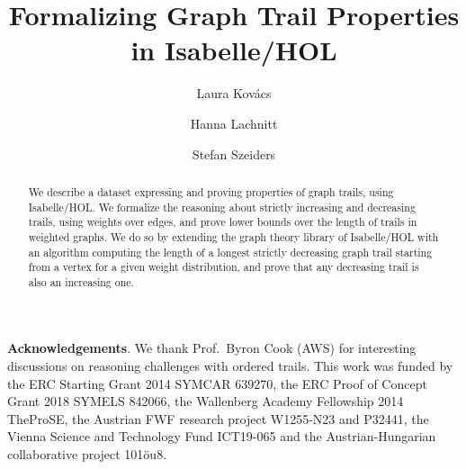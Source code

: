 \documentclass[runningheads]{llncs}
\begin{document}
\title{Formalizing Graph Trail Properties in Isabelle/HOL}
\author{Laura Kov{\'a}cs \and Hanna Lachnitt \and Stefan Szeiders}
\maketitle


\begin{abstract}
	We describe a dataset expressing and proving properties of graph trails, using Isabelle/HOL.
	We formalize the reasoning about strictly increasing and decreasing trails, using weights over edges,
	and prove lower bounds over the length of trails in weighted graphs. We do so by extending the graph theory library of Isabelle/HOL with an algorithm computing the length of a longest strictly decreasing graph trail starting from a vertex for a given weight distribution, and prove that any decreasing trail is also an increasing one.
\end{abstract}






\bigskip\noindent\textbf{Acknowledgements}. We thank Prof.~Byron Cook (AWS) for interesting discussions on reasoning challenges with ordered trails. This work was funded by the ERC Starting Grant 2014 SYMCAR
639270, the ERC Proof of Concept Grant 2018 SYMELS 842066, the Wallenberg Academy
Fellowship 2014 TheProSE, the Austrian FWF research project W1255-N23 and P32441,  the Vienna Science and Technology Fund ICT19-065 and the Austrian-Hungarian collaborative project 101\"ou8.

%

 
\end{document}
